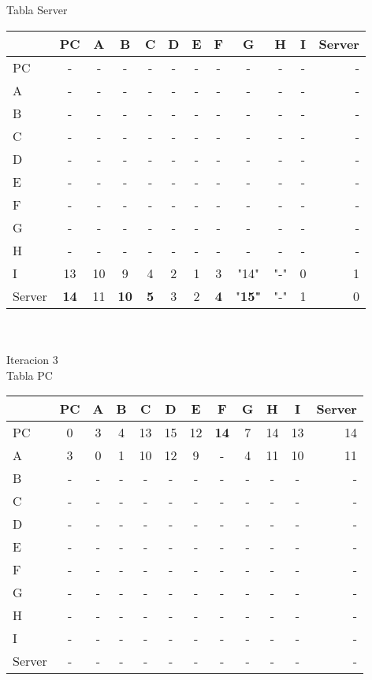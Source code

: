 \documentclass{article}
\begin{document}
\\
\\
Tabla Server \\
\begin{tabular}{l*{10}{c}r}
              & PC & A & B & C & D & E & F & G & H & I & Server \\
\hline
PC             & - & - & - & - & - & - & - & - & - & - & -\\
A              & - & - & - & - & - & - & - & - & - & - & -\\
B              & - & - & - & - & - & - & - & - & - & - & -\\
C              & - & - & - & - & - & - & - & - & - & - & -\\
D              & - & - & - & - & - & - & - & - & - & - & -\\
E              & - & - & - & - & - & - & - & - & - & - & -\\
F              & - & - & - & - & - & - & - & - & - & - & -\\
G              & - & - & - & - & - & - & - & - & - & - & -\\
H              & - & - & - & - & - & - & - & - & - & - & -\\
I              & 13 & 10 & 9 & 4 & 2 & 1 & 3 & "14" & "-" & 0 & 1\\
Server         &\bf{14}& 11 &\bf{10}&\bf{5}& 3 & 2 &\bf{4}&"\bf{15}"& "-" & 1 & 0\\

\end{tabular}
\\
\\
Iteracion 3
\\
Tabla PC \\
\begin{tabular}{l*{10}{c}r}
              & PC & A & B & C & D & E & F  & G & H & I & Server \\
\hline
PC             & 0 & 3 & 4 & 13& 15& 12&\bf{14}& 7 & 14 & 13 & 14\\
A              & 3 & 0 & 1 & 10 & 12 & 9 & - & 4 & 11 & 10 & 11 \\
B              & - & - & - & - & - & - & - & - & - & - & - \\
C              & - & - & - & - & - & - & - & - & - & - & - \\
D              & - & - & - & - & - & - & - & - & - & - & - \\
E              & - & - & - & - & - & - & - & - & - & - & - \\
F              & - & - & - & - & - & - & - & - & - & - & - \\
G              & - & - & - & - & - & - & - & - & - & - & - \\
H              & - & - & - & - & - & - & - & - & - & - & - \\
I              & - & - & - & - & - & - & - & - & - & - & - \\
Server         & - & - & - & - & - & - & - & - & - & - & - \\	

\end{tabular}
\end{document}
